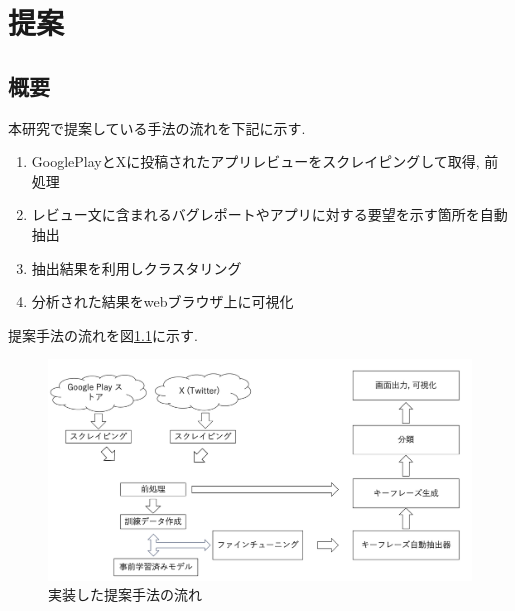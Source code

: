 \chapter{提案}
\label{chap:teian}


\section{概要}
本研究で提案している手法の流れを下記に示す. 

\begin{enumerate}
  \item GooglePlayとXに投稿されたアプリレビューをスクレイピングして取得, 前処理
  \item レビュー文に含まれるバグレポートやアプリに対する要望を示す箇所を自動抽出
  \item 抽出結果を利用しクラスタリング
  \item 分析された結果をwebブラウザ上に可視化
\end{enumerate}

提案手法の流れを図\ref{fig:nagare}に示す. 

\begin{figure}[hbtp]
  \centering
  \includegraphics[width=\linewidth]
       {contents/images/zisso_nagare.png}
  \caption{実装した提案手法の流れ\label{fig:nagare}}
\end{figure}


